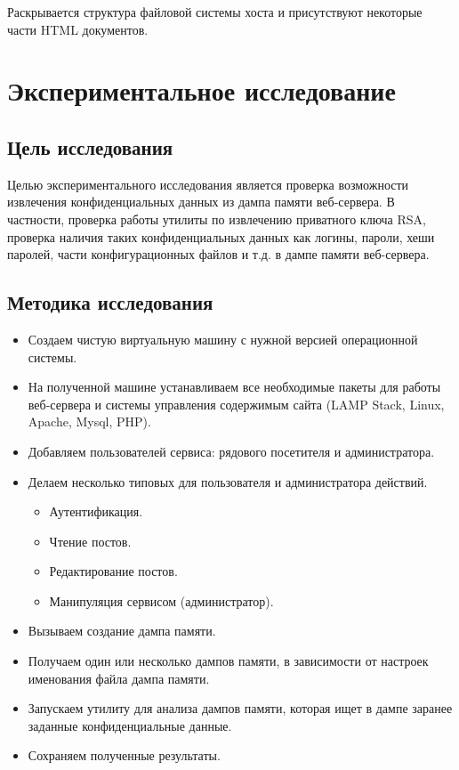 \documentclass[20pt]{article}
\begin{document}
Раскрывается структура файловой системы хоста и присутствуют некоторые части
HTML документов.

\newpage

\section{Экспериментальное исследование}

\subsection{Цель исследования}

Целью экспериментального исследования является проверка возможности извлечения
конфиденциальных данных из дампа памяти веб-сервера. В частности, проверка работы
утилиты по извлечению приватного ключа RSA, проверка наличия таких конфиденциальных
данных как логины, пароли, хеши паролей, части конфигурационных файлов и т.д. в
дампе памяти веб-сервера.

\subsection{Методика исследования}

\begin{itemize}
  \item Создаем чистую виртуальную машину с нужной версией операционной системы.
  \item На полученной машине устанавливаем все необходимые пакеты для работы
  веб-сервера и системы управления содержимым сайта (LAMP Stack, Linux, Apache,
  Mysql, PHP).
  \item Добавляем пользователей сервиса: рядового посетителя и администратора.
  \item Делаем несколько типовых для пользователя и администратора действий.
  \begin{itemize}
    \item Аутентификация.
    \item Чтение постов.
    \item Редактирование постов.
    \item Манипуляция сервисом (администратор).
  \end{itemize}
  \item Вызываем создание дампа памяти.
  \item Получаем один или несколько дампов памяти, в зависимости от настроек
  именования файла дампа памяти.
  \item Запускаем утилиту для анализа дампов памяти, которая ищет в дампе
  заранее заданные конфиденциальные данные.
  \item Сохраняем полученные результаты.
\end{itemize}
\end{document}
